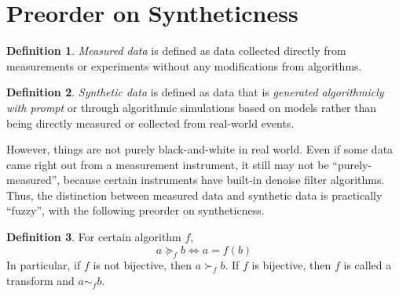 \documentclass[10pt,reqno]{amsart}
\theoremstyle{definition}
\newtheorem{defn}{Definition}[section]
\theoremstyle{remark}
\numberwithin{equation}{section}
\begin{document}
\section{Preorder on Syntheticness}
\begin{defn}
\emph{Measured data} is defined as data collected directly from measurements or experiments without any modifications from algorithms.
\end{defn}

\begin{defn}
\emph{Synthetic data} is defined as data that is \emph{generated algorithmicly with prompt} or through algorithmic simulations based on models rather than being directly measured or collected from real-world events.
\end{defn}


However, things are not purely black-and-white in real world. Even if some data came right out from a measurement instrument, it still may not be ``purely-measured'', because certain instruments have built-in denoise filter algorithms. Thus, the distinction between measured data and synthetic data is practically ``fuzzy'', with the following preorder on syntheticness. 
\begin{defn}
For certain algorithm $f$,
\begin{equation}
a \succeq_f b \iff  a = f(b)
\end{equation}
In particular, if $f$ is not bijective, then $a \succ_f b$. If $f$ is bijective, then $f$ is called a transform and $a\sim_f b$.
\end{defn}
\end{document}
